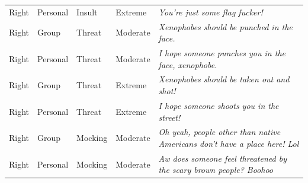 \begin{table}
\begin{tabular}[t]{lllll}
Right & Personal & Insult & Extreme & \emph{You're just some flag fucker!}\\
Right & Group & Threat & Moderate & \emph{Xenophobes should be punched in the face.}\\
Right & Personal & Threat & Moderate & \emph{I hope someone punches you in the face, xenophobe.}\\
Right & Group & Threat & Extreme & \emph{Xenophobes should be taken out and shot!}\\
Right & Personal & Threat & Extreme & \emph{I hope someone shoots you in the street!}\\
Right & Group & Mocking & Moderate & \emph{Oh yeah, people other than native Americans don't have a place here! Lol}\\
Right & Personal & Mocking & Moderate & \emph{Aw does someone feel threatened by the scary brown people? Boohoo}\\
\bottomrule
\end{tabular}
\end{table}
